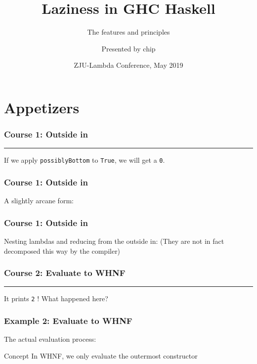 \documentclass{beamer}
\title[Laziness in GHC Haskell]
{Laziness in GHC Haskell}
\subtitle{The features and principles}
\author[chip]
{Presented by chip}
\institute[ZJU]
{
  ZJU Lambda\\
  From here to World
}
\date[ZJU-Lambda 2019]
{ZJU-Lambda Conference, May 2019}
\newcommand{\inlinehaskell}[1]{\texttt{#1}}
\begin{document}
\frame{\titlepage}


\section{Appetizers}

\begin{frame}
\frametitle{Course 1: Outside in}
\par\noindent\rule{0.75\textwidth}{1.0pt}
\newline\newline
If we apply \inlinehaskell{possiblyBottom} to \inlinehaskell{True}, we will get a \inlinehaskell{0}.
\end{frame}


\begin{frame}
\frametitle{Course 1: Outside in}
A slightly arcane form:\newline
{}
\end{frame}


\begin{frame}
\frametitle{Course 1: Outside in}
Nesting lambdas and reducing from the outside in:\newline
(They are not in fact decomposed this way by the compiler)\newline
{}
\end{frame}


\begin{frame}
\frametitle{Course 2: Evaluate to WHNF}
\par\noindent\rule{0.7\textwidth}{1.0pt}
\newline\newline
It prints \inlinehaskell{2} !
\newline
What happened here?
\end{frame}


\begin{frame}
\frametitle{Example 2: Evaluate to WHNF}
The actual evaluation process:
\newline
{}
\begin{block}{Concept}
In WHNF, we only evaluate the outermost constructor
\end{block}
\end{frame}
\end{document}
